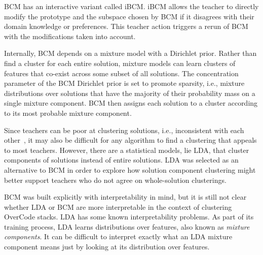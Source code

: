 BCM has an interactive variant called iBCM. iBCM allows the teacher to directly modify the prototype and the subspace chosen by BCM if it disagrees with their domain knowledge or preferences. This teacher action triggers a rerun of BCM with the modifications taken into account.%

Internally, BCM depends on a mixture model with a Dirichlet prior. Rather than find a cluster for each entire solution, mixture models can learn clusters of features that co-exist across some subset of all solutions. The concentration parameter of the BCM Dirichlet prior is set to promote sparsity, i.e., mixture distributions over solutions that have the majority of their probability mass on a single mixture component. BCM then assigns each solution to a cluster according to its most probable mixture component. %

Since teachers can be poor at clustering solutions, i.e., inconsistent with each other~\cite{ACESthesis}, it may also be difficult for any algorithm to find a clustering that appeals to most teachers. However, there are a statistical models, lie LDA, that cluster components of solutions instead of entire solutions. LDA was selected as an alternative to BCM in order to explore how solution component clustering might better support teachers who do not agree on whole-solution clusterings.


BCM was built explicitly with interpretability in mind, but it is still not clear whether LDA or BCM are more interpretable in the context of clustering OverCode stacks. LDA has some known interpretability problems. As part of its training process, LDA learns distributions over features, also known as {\it mixture components}. It can be difficult to interpret exactly what an LDA mixture component means just by looking at its distribution over features.


